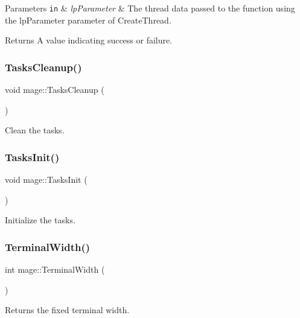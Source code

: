 \begin{DoxyParams}[1]{Parameters}
\mbox{\tt in}  & {\em lp\+Parameter} & The thread data passed to the function using the {\ttfamily lp\+Parameter} parameter of Create\+Thread. \\
\hline
\end{DoxyParams}
\begin{DoxyReturn}{Returns}
A value indicating success or failure. 
\end{DoxyReturn}
\hypertarget{namespacemage_a118ddaa5d9606328a0af412c85832e6b}{}\label{namespacemage_a118ddaa5d9606328a0af412c85832e6b} 
\subsubsection{\texorpdfstring{Tasks\+Cleanup()}{TasksCleanup()}}
{\footnotesize\ttfamily void mage\+::\+Tasks\+Cleanup (\begin{DoxyParamCaption}{ }\end{DoxyParamCaption})}

Clean the tasks. \hypertarget{namespacemage_a8252f7acebefd3efe34a15cc51e4a7ac}{}\label{namespacemage_a8252f7acebefd3efe34a15cc51e4a7ac} 
\subsubsection{\texorpdfstring{Tasks\+Init()}{TasksInit()}}
{\footnotesize\ttfamily void mage\+::\+Tasks\+Init (\begin{DoxyParamCaption}{ }\end{DoxyParamCaption})}

Initialize the tasks. \hypertarget{namespacemage_a0c12a51bf3468b372932ffc1138a4ddc}{}\label{namespacemage_a0c12a51bf3468b372932ffc1138a4ddc} 
\subsubsection{\texorpdfstring{Terminal\+Width()}{TerminalWidth()}}
{\footnotesize\ttfamily int mage\+::\+Terminal\+Width (\begin{DoxyParamCaption}{ }\end{DoxyParamCaption})}

Returns the fixed terminal width.

